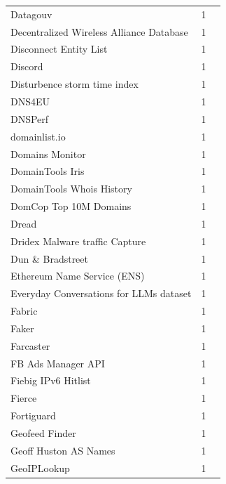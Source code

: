 \documentclass[11pt,a4paper]{article}
\begin{document}
\begin{longtable}{@{}p{} p{}p{}@{}}
Datagouv & 1 & \cite{10.1145/3777912.3839827} \\
Decentralized Wireless Alliance Database & 1 & \cite{10.1145/3487552.3487846} \\
Disconnect Entity List & 1 & \cite{10.1145/3618257.3624823} \\
Discord & 1 & \cite{10.1145/3777912.3809150} \\
Disturbence storm time index & 1 & \cite{10.1145/3646547.3689024} \\
DNS4EU & 1 & \cite{10.1145/3777912.3839811} \\
DNSPerf & 1 & \cite{10.1145/3517745.3561445} \\
domainlist.io & 1 & \cite{10.1007/978-3-030-72582-2_3} \\
Domains Monitor & 1 & \cite{10.1007/978-3-031-56252-5_4} \\
DomainTools Iris & 1 & \cite{10.1145/3517745.3561425} \\
DomainTools Whois History & 1 & \cite{10.1145/3487552.3487816} \\
DomCop Top 10M Domains & 1 & \cite{10.1145/3777912.3839797} \\
Dread & 1 & \cite{10.1145/3777912.3839814} \\
Dridex Malware traffic Capture & 1 & \cite{10.1007/978-3-031-28486-1_5} \\
Dun \& Bradstreet & 1 & \cite{10.1145/3487552.3487853} \\
Ethereum Name Service (ENS) & 1 & \cite{10.1145/3618257.3624797} \\
Everyday Conversations for LLMs dataset & 1 & \cite{10.1145/3730567.3764441} \\
Fabric & 1 & \cite{10.1145/3646547.3688441} \\
Faker & 1 & \cite{10.1145/3517745.3561467} \\
Farcaster & 1 & \cite{10.1145/3777912.3809136} \\
FB Ads Manager API & 1 & \cite{10.1145/3487552.3487861} \\
Fiebig IPv6 Hitlist & 1 & \cite{10.1145/3646547.3688420} \\
Fierce & 1 & \cite{10.1007/978-3-031-56249-5_4} \\
Fortiguard & 1 & \cite{10.1145/3777912.3839787} \\
Geofeed Finder & 1 & \cite{10.1007/978-3-031-56252-5_11} \\
Geoff Huston AS Names & 1 & \cite{10.1007/978-3-030-98785-5_9} \\
GeoIPLookup & 1 & \cite{10.1145/3487552.3487854} \\

\end{longtable}
\end{document}
